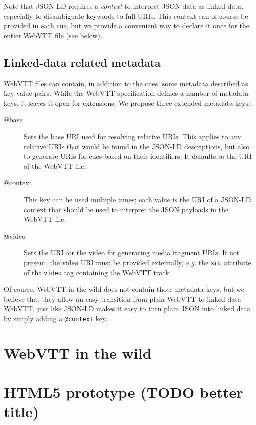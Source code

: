 \documentclass{sig-alternate}
\begin{document}
Note that JSON-LD requires a \emph{context} to interpret JSON data as linked data,
especially to disambiguate keywords to full URIs.
This context can of course be provided in each cue,
but we provide a convenient way to declare it once for the entier WebVTT file (see below).

\subsection{Linked-data related metadata}

WebVTT files can contain, in addition to the cues, some metadata described as key-value pairs.
While the WebVTT specification defines a number of metadata keys,
it leaves it open for extensions.
We propose three extended metadata keys:

\begin{description}

\item[@base]
Sets the base URI used for resolving relative URIs.
This applies to any relative URIs that would be found in the JSON-LD descriptions,
but also to generate URIs for cues based on their identifiers.
It defaults to the URI of the WebVTT file.

\item[@context]
This key can be used multiple times; each value is the URI of a JSON-LD context
that should be used to interpret the JSON payloads in the WebVTT file.

\item[@video]
Sets the URI for the video for generating media fragment URIs.
If not present, the video URI must be provided externally,
\textit{e.g.} the \texttt{src} attribute of the \texttt{video} tag
containing the WebVTT track.

\end{description}

Of course, WebVTT in the wild does not contain those metadata keys,
but we believe that they allow an easy transition
from plain WebVTT to linked-data WebVTT,
just like JSON-LD makes it easy to turn plain JSON into linked data
by simply adding a \texttt{@context} key.



\section{WebVTT in the wild}

\section{HTML5 prototype (TODO better title)}
\end{document}
